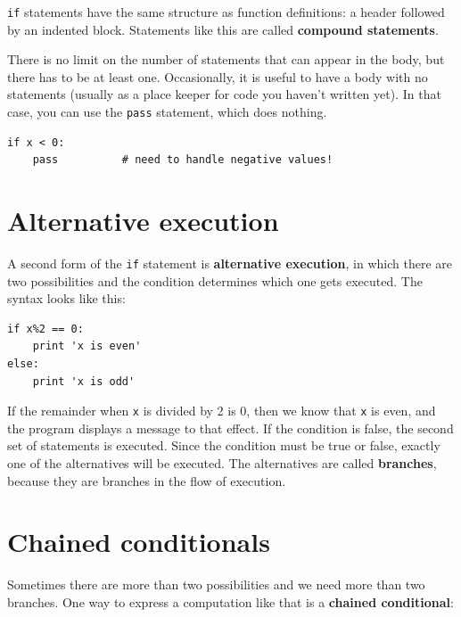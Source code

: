 \documentclass[10pt]{book}
\begin{document}
{\tt if} statements have the same structure as function definitions:
a header followed by an indented block.  Statements like this are
called {\bf compound statements}.

There is no limit on the number of statements that can appear in
the body, but there has to be at least one.
Occasionally, it is useful to have a body with no statements (usually
as a place keeper for code you haven't written yet).  In that
case, you can use the {\tt pass} statement, which does nothing.


\beforeverb
\begin{verbatim}
if x < 0:
    pass          # need to handle negative values!
\end{verbatim}
\afterverb
%

\section{Alternative execution}
\label{alternative execution}


A second form of the {\tt if} statement is {\bf alternative execution},
in which there are two possibilities and the condition determines
which one gets executed.  The syntax looks like this:

\beforeverb
\begin{verbatim}
if x%2 == 0:
    print 'x is even'
else:
    print 'x is odd'
\end{verbatim}
\afterverb
%
If the remainder when {\tt x} is divided by 2 is 0, then we
know that {\tt x} is even, and the program displays a message to that
effect.  If the condition is false, the second set of statements is
executed.  Since the condition must be true or false, exactly one of
the alternatives will be executed.  The alternatives are called
{\bf branches}, because they are branches in the flow of execution.




\section{Chained conditionals}

Sometimes there are more than two possibilities and we need more than
two branches.  One way to express a computation like that is a {\bf
chained conditional}:
\end{document}
